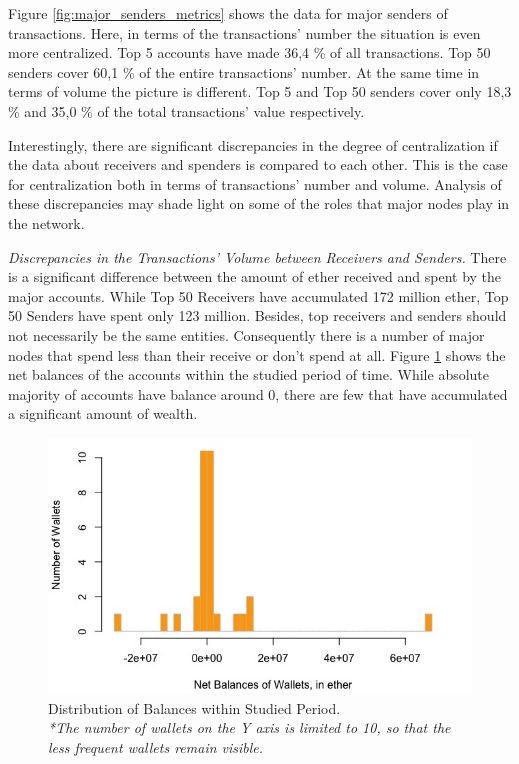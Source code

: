 Figure \ref{fig:major_senders_metrics} shows the data for major senders of transactions.
Here, in terms of the transactions' number the situation is even more centralized.
Top 5 accounts have made 36,4 \% of all transactions.
Top 50 senders cover 60,1 \% of the entire transactions' number.
At the same time in terms of volume the picture is different.
Top 5 and Top 50 senders cover only 18,3 \% and 35,0 \% of the total transactions' value respectively.

Interestingly, there are significant discrepancies in the degree of centralization if the data about receivers and spenders is compared to each other.
This is the case for centralization both in terms of transactions' number and volume.
Analysis of these discrepancies may shade light on some of the roles that major nodes play in the network.

\textit{Discrepancies in the Transactions' Volume between Receivers and Senders.} 
There is a significant difference between the amount of ether received and spent by the major accounts.
While Top 50 Receivers have accumulated 172 million ether, Top 50 Senders have spent only 123 million.
Besides, top receivers and senders should not necessarily be the same entities. 
Consequently there is a number of major nodes that spend less than their receive or don't spend at all.
Figure \ref{fig:balances} shows the net balances of the accounts within the studied period of time. 
While absolute majority of accounts have balance around 0, there are few that have accumulated a significant amount of wealth.

\begin{figure}[h!]
  \centering
  \includegraphics[width=1\linewidth]{figures/balances.jpeg}
  \caption{Distribution of Balances within Studied Period. \\ 
  \textit{*The number of wallets on the Y axis is limited to 10, so that the less frequent wallets remain visible.}}
  \label{fig:balances}
\end{figure}

